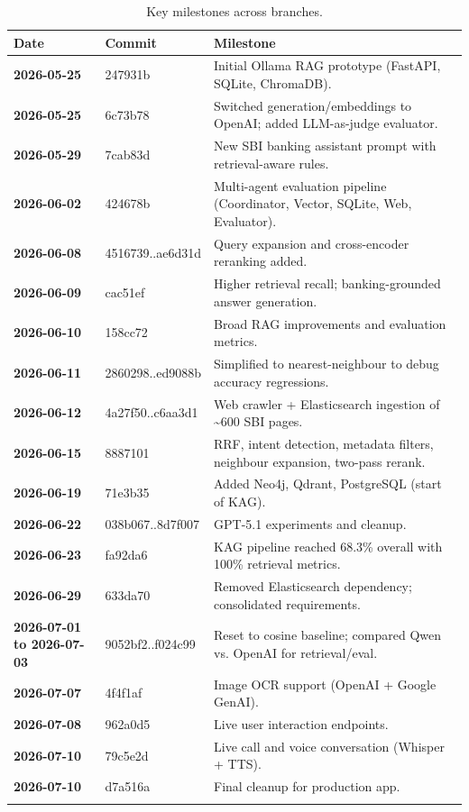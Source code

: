\documentclass[11pt,a4paper]{article}
\begin{document}
\begin{longtable}{@{}>{\bfseries}p{}p{}p{}@{}}
\toprule
Date & Commit & Milestone \\
\midrule
\endhead
2026-05-25 & 247931b & Initial Ollama RAG prototype (FastAPI, SQLite, ChromaDB). \\
2026-05-25 & 6c73b78 & Switched generation/embeddings to OpenAI; added LLM-as-judge evaluator. \\
2026-05-29 & 7cab83d & New SBI banking assistant prompt with retrieval-aware rules. \\
2026-06-02 & 424678b & Multi-agent evaluation pipeline (Coordinator, Vector, SQLite, Web, Evaluator). \\
2026-06-08 & 4516739..ae6d31d & Query expansion and cross-encoder reranking added. \\
2026-06-09 & cac51ef & Higher retrieval recall; banking-grounded answer generation. \\
2026-06-10 & 158cc72 & Broad RAG improvements and evaluation metrics. \\
2026-06-11 & 2860298..ed9088b & Simplified to nearest-neighbour to debug accuracy regressions. \\
2026-06-12 & 4a27f50..c6aa3d1 & Web crawler + Elasticsearch ingestion of \textasciitilde600 SBI pages. \\
2026-06-15 & 8887101 & RRF, intent detection, metadata filters, neighbour expansion, two-pass rerank. \\
2026-06-19 & 71e3b35 & Added Neo4j, Qdrant, PostgreSQL (start of KAG). \\
2026-06-22 & 038b067..8d7f007 & GPT-5.1 experiments and cleanup. \\
2026-06-23 & fa92da6 & KAG pipeline reached 68.3\% overall with 100\% retrieval metrics. \\
2026-06-29 & 633da70 & Removed Elasticsearch dependency; consolidated requirements. \\
2026-07-01 to 2026-07-03 & 9052bf2..f024c99 & Reset to cosine baseline; compared Qwen vs. OpenAI for retrieval/eval. \\
2026-07-07 & 4f4f1af & Image OCR support (OpenAI + Google GenAI). \\
2026-07-08 & 962a0d5 & Live user interaction endpoints. \\
2026-07-10 & 79c5e2d & Live call and voice conversation (Whisper + TTS). \\
2026-07-10 & d7a516a & Final cleanup for production app. \\
\bottomrule
\caption{Key milestones across branches.}
\end{longtable}
\end{document}
